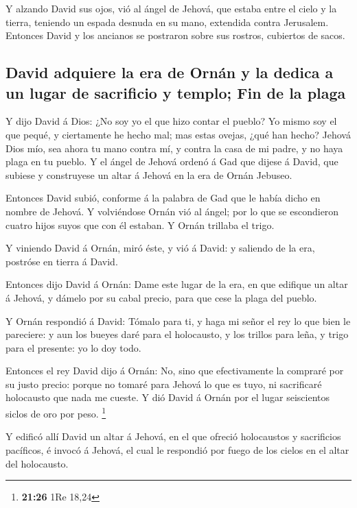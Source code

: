  Y alzando David sus ojos, vió al ángel de Jehová, que
estaba entre el cielo y la tierra, teniendo un espada desnuda en su
mano, extendida contra Jerusalem. Entonces David y los ancianos se
postraron sobre sus rostros, cubiertos de sacos.

\hypertarget{david-adquiere-la-era-de-ornuxe1n-y-la-dedica-a-un-lugar-de-sacrificio-y-templo-fin-de-la-plaga}{%
\subsection{David adquiere la era de Ornán y la dedica a un lugar de
sacrificio y templo; Fin de la
plaga}\label{david-adquiere-la-era-de-ornuxe1n-y-la-dedica-a-un-lugar-de-sacrificio-y-templo-fin-de-la-plaga}}

 Y dijo David á Dios: ¿No soy yo el que hizo contar el
pueblo? Yo mismo soy el que pequé, y ciertamente he hecho mal; mas estas
ovejas, ¿qué han hecho? Jehová Dios mío, sea ahora tu mano contra mí, y
contra la casa de mi padre, y no haya plaga en tu pueblo.
 Y el ángel de Jehová ordenó á Gad que dijese á David,
que subiese y construyese un altar á Jehová en la era de Ornán Jebuseo.

 Entonces David subió, conforme á la palabra de Gad que
le había dicho en nombre de Jehová.  Y volviéndose Ornán
vió al ángel; por lo que se escondieron cuatro hijos suyos que con él
estaban. Y Ornán trillaba el trigo.

 Y viniendo David á Ornán, miró éste, y vió á David: y
saliendo de la era, postróse en tierra á David.

 Entonces dijo David á Ornán: Dame este lugar de la era,
en que edifique un altar á Jehová, y dámelo por su cabal precio, para
que cese la plaga del pueblo.

 Y Ornán respondió á David: Tómalo para ti, y haga mi
señor el rey lo que bien le pareciere: y aun los bueyes daré para el
holocausto, y los trillos para leña, y trigo para el presente: yo lo doy
todo.

 Entonces el rey David dijo á Ornán: No, sino que
efectivamente la compraré por su justo precio: porque no tomaré para
Jehová lo que es tuyo, ni sacrificaré holocausto que nada me cueste.
 Y dió David á Ornán por el lugar seiscientos siclos de
oro por peso. \footnote{\textbf{21:26} 1Re 18,24}

 Y edificó allí David un altar á Jehová, en el que
ofreció holocaustos y sacrificios pacíficos, é invocó á Jehová, el cual
le respondió por fuego de los cielos en el altar del holocausto.

